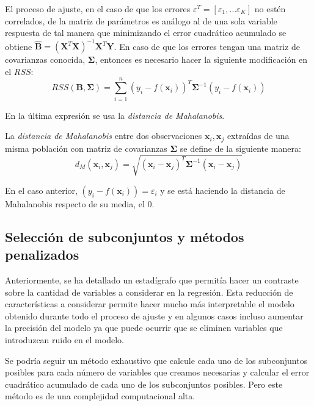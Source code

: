 \noindent El proceso de ajuste, en el caso de que los errores $\varepsilon^T=[\varepsilon_1,\ldots \varepsilon_K]$ no estén correlados, de la matriz de parámetros es análogo al de una sola variable respuesta de tal manera que minimizando el error cuadrático acumulado se obtiene $\hat{\textbf{B}}=(\textbf{X}^T\textbf{X})^{-1}\textbf{X}^T\textbf{Y}$. En caso de que los errores tengan una matriz de covarianzas conocida, $\mathbf{\Sigma}$, entonces es necesario hacer la siguiente modificación en el $RSS$:
\begin{equation}
RSS(\textbf{B},\mathbf{\Sigma})=\sum_{i=1}^n(y_i-f(\textbf{x}_i))^T \mathbf{\Sigma}^{-1} (y_i-f(\textbf{x}_i))
\end{equation}

\noindent En la última expresión se usa la \textit{distancia de Mahalanobis}.
\begin{defi}
La \textit{distancia de Mahalanobis} entre dos observaciones $\textbf{x}_i, \textbf{x}_j$ extraídas de una misma población con matriz de covarianzas $\mathbf{\Sigma}$ se define de la siguiente manera\cite{Cuadras 2014}: 
\begin{equation}
d_M(\textbf{x}_i, \textbf{x}_j)=\sqrt{(\textbf{x}_i- \textbf{x}_j)^T \mathbf{\Sigma}^{-1}(\textbf{x}_i-\textbf{x}_j)}
\end{equation}
\end{defi}

\noindent En el caso anterior, $(y_i-f(\textbf{x}_i))=\varepsilon_i$ y se está haciendo la distancia de Mahalanobis respecto de su media, el 0. 


\subsection*{Selección de subconjuntos y métodos penalizados}

\noindent Anteriormente, se ha detallado un estadígrafo que permitía hacer un contraste sobre la cantidad de variables a considerar en la regresión. 
Esta reducción de características a considerar permite hacer mucho más interpretable el modelo obtenido durante todo el proceso de ajuste y en algunos casos incluso aumentar la precisión del modelo ya que puede ocurrir que se eliminen variables que introduzcan ruido en el modelo. 

\noindent Se podría seguir un método exhaustivo que calcule cada uno de los subconjuntos posibles para cada número de variables que creamos necesarias y calcular el error cuadrático acumulado de cada uno de los subconjuntos posibles. Pero este método es de una complejidad computacional alta. 

